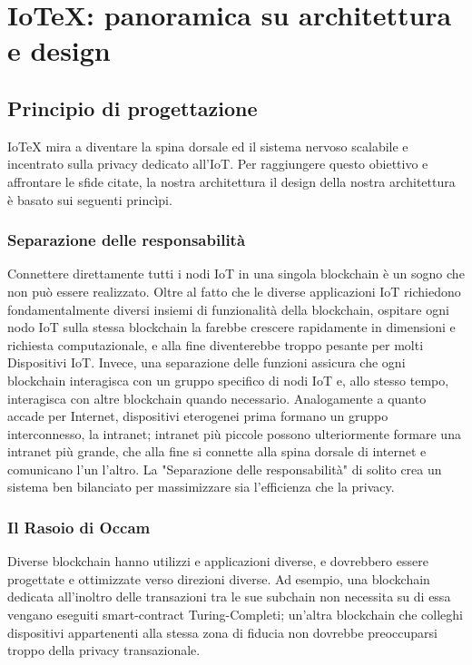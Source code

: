 \section{IoTeX: panoramica su architettura e design}

\subsection{Principio di progettazione}
IoTeX mira a diventare la spina dorsale ed il sistema nervoso scalabile e incentrato sulla privacy dedicato all'IoT. Per raggiungere questo obiettivo e affrontare le sfide citate, la nostra architettura il design della nostra architettura è basato sui seguenti princìpi.

\subsubsection{Separazione delle responsabilità}
Connettere direttamente tutti i nodi IoT in una singola blockchain è un sogno che non può essere realizzato. Oltre al fatto che le diverse applicazioni IoT richiedono fondamentalmente diversi insiemi di funzionalità della blockchain, ospitare ogni nodo IoT sulla stessa blockchain la farebbe crescere rapidamente in dimensioni e richiesta computazionale, e alla fine diventerebbe troppo pesante per molti Dispositivi IoT. Invece, una separazione delle funzioni assicura che ogni blockchain interagisca con un gruppo specifico di nodi IoT e, allo stesso tempo, interagisca con altre blockchain quando necessario. Analogamente a quanto accade per Internet, dispositivi eterogenei prima formano un gruppo interconnesso, la intranet; intranet più piccole possono ulteriormente formare una intranet più grande, che alla fine si connette alla spina dorsale di internet e comunicano l'un l'altro.
La "Separazione delle responsabilità" di solito crea un sistema ben bilanciato per massimizzare sia l'efficienza che la privacy.

\subsubsection{Il Rasoio di Occam}
Diverse blockchain hanno utilizzi e applicazioni diverse, e dovrebbero essere progettate e ottimizzate verso direzioni diverse. Ad esempio, una blockchain dedicata all'inoltro delle transazioni tra le sue subchain non necessita su di essa vengano eseguiti smart-contract Turing-Completi; un'altra blockchain che colleghi dispositivi appartenenti alla stessa zona di fiducia non dovrebbe preoccuparsi troppo della privacy transazionale.


